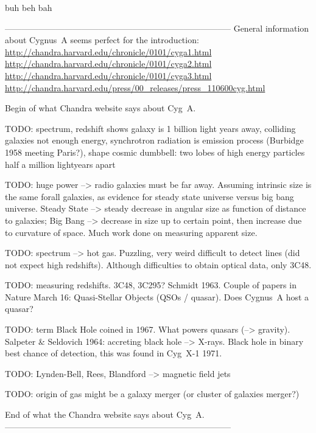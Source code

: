 \documentclass[MScProj_TLRH_ClusterEnergy.tex]{subfiles}
\begin{document}
\newpage
buh
\newpage
beh
\newpage
bah
\newpage

--------------------------------------------------------------------------------
General information about Cygnus~A seems perfect for the introduction: \\
\url{http://chandra.harvard.edu/chronicle/0101/cyga1.html} \\
\url{http://chandra.harvard.edu/chronicle/0101/cyga2.html} \\
\url{http://chandra.harvard.edu/chronicle/0101/cyga3.html} \\
\url{http://chandra.harvard.edu/press/00_releases/press_110600cyg.html}

Begin of what Chandra website says about Cyg~A.

TODO: spectrum, redshift shows galaxy is 1 billion light years away, colliding galaxies not enough energy, synchrotron radiation is emission process (Burbidge 1958 meeting Paris?), shape cosmic dumbbell: two lobes of high energy particles half a million lightyears apart

TODO: huge power --> radio galaxies must be far away. Assuming intrinsic size is the same forall galaxies, as evidence for steady state universe versus big bang universe. Steady State --> steady decrease in angular size as function of distance to galaxies; Big Bang --> decrease in size up to certain point, then increase due to curvature of space. Much work done on measuring apparent size.

TODO: spectrum --> hot gas. Puzzling, very weird difficult to detect lines (did not expect high redshifts). Although difficulties to obtain optical data, only 3C48.

TODO: measuring redshifts. 3C48, 3C295? Schmidt 1963. Couple of papers in Nature March 16: Quasi-Stellar Objects (QSOs / quasar). Does Cygnus~A host a quasar? \citep{1963Natur.197.1037H, 1963Natur.197.1040S, 1963Natur.197.1040O, 1963Natur.197.1041G}

TODO: term Black Hole coined in 1967. What powers quasars (--> gravity). Salpeter \& Seldovich 1964: accreting black hole --> X-rays. Black hole in binary best chance of detection, this was found in Cyg~X-1 1971.

TODO: Lynden-Bell, Rees, Blandford --> magnetic field jets

TODO: origin of gas might be a galaxy merger (or cluster of galaxies merger?)

End of what the Chandra website says about Cyg~A.
--------------------------------------------------------------------------------
\end{document}
